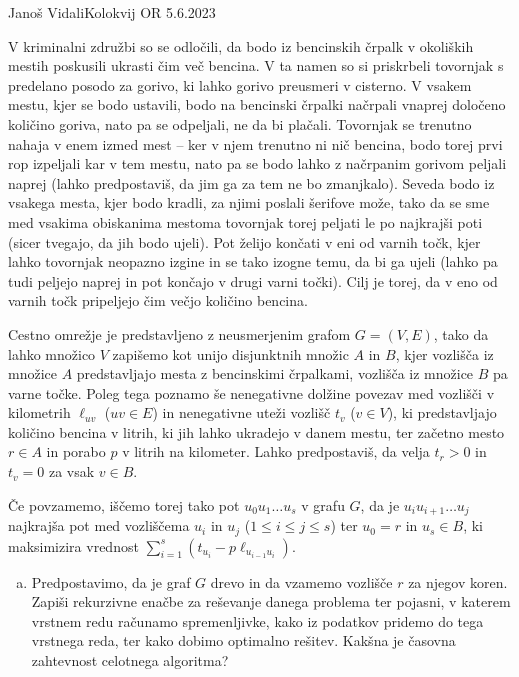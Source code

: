 \begin{naloga}{Janoš Vidali}{Kolokvij OR 5.6.2023}
\begin{vprasanje}
V kriminalni združbi so se odločili,
da bodo iz bencinskih črpalk v okoliških mestih poskusili ukrasti čim več bencina.
V ta namen so si priskrbeli tovornjak s predelano posodo za gorivo,
ki lahko gorivo preusmeri v cisterno.
V vsakem mestu, kjer se bodo ustavili,
bodo na bencinski črpalki načrpali vnaprej določeno količino goriva,
nato pa se odpeljali, ne da bi plačali.
Tovornjak se trenutno nahaja v enem izmed mest
-- ker v njem trenutno ni nič bencina,
bodo torej prvi rop izpeljali kar v tem mestu,
nato pa se bodo lahko z načrpanim gorivom peljali naprej
(lahko predpostaviš, da jim ga za tem ne bo zmanjkalo).
Seveda bodo iz vsakega mesta, kjer bodo kradli,
za njimi poslali šerifove može,
tako da se sme med vsakima obiskanima mestoma
tovornjak torej peljati le po najkrajši poti
(sicer tvegajo, da jih bodo ujeli).
Pot želijo končati v eni od varnih točk,
kjer lahko tovornjak neopazno izgine in se tako izogne temu,
da bi ga ujeli
(lahko pa tudi peljejo naprej in pot končajo v drugi varni točki).
Cilj je torej, da v eno od varnih točk pripeljejo čim večjo količino bencina.

Cestno omrežje je predstavljeno z neusmerjenim grafom $G = (V, E)$,
tako da lahko množico $V$ zapišemo kot unijo disjunktnih množic $A$ in $B$,
kjer vozlišča iz množice $A$ predstavljajo mesta z bencinskimi črpalkami,
vozlišča iz množice $B$ pa varne točke.
Poleg tega poznamo še nenegativne dolžine povezav med vozlišči
v kilometrih $\ell_{uv}$ ($uv \in E$)
in nenegativne uteži vozlišč $t_v$ ($v \in V$),
ki predstavljajo količino bencina v litrih,
ki jih lahko ukradejo v danem mestu,
ter začetno mesto $r \in A$
in porabo $p$ v litrih na kilometer.
Lahko predpostaviš,
da velja $t_r > 0$ in $t_v = 0$ za vsak $v \in B$.

Če povzamemo, iščemo torej tako pot $u_0 u_1 \dots u_s$ v grafu $G$,
da je $u_i u_{i+1} \dots u_j$ najkrajša pot med vozliščema $u_i$ in $u_j$
($1 \le i \le j \le s$)
ter $u_0 = r$ in $u_s \in B$,
ki maksimizira vrednost $\sum_{i=1}^s (t_{u_i} - p \ell_{u_{i-1} u_i})$.

\begin{enumerate}[(a)]
\item Predpostavimo, da je graf $G$ drevo in da vzamemo vozlišče $r$ za njegov koren.
Zapiši rekurzivne enačbe za reševanje danega problema ter pojasni,
v katerem vrstnem redu računamo spremenljivke,
kako iz podatkov pridemo do tega vrstnega reda,
ter kako dobimo optimalno rešitev.
Kakšna je časovna zahtevnost celotnega algoritma?


\end{enumerate}
\end{vprasanje}
\end{naloga}
